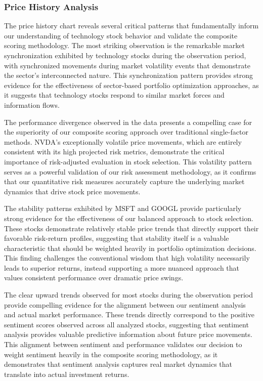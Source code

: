 \documentclass[12pt,a4paper]{article}
\begin{document}
\subsubsection{Price History Analysis}
The price history chart reveals several critical patterns that fundamentally inform our understanding of technology stock behavior and validate the composite scoring methodology. The most striking observation is the remarkable market synchronization exhibited by technology stocks during the observation period, with synchronized movements during market volatility events that demonstrate the sector's interconnected nature. This synchronization pattern provides strong evidence for the effectiveness of sector-based portfolio optimization approaches, as it suggests that technology stocks respond to similar market forces and information flows.

The performance divergence observed in the data presents a compelling case for the superiority of our composite scoring approach over traditional single-factor methods. NVDA's exceptionally volatile price movements, which are entirely consistent with its high projected risk metrics, demonstrate the critical importance of risk-adjusted evaluation in stock selection. This volatility pattern serves as a powerful validation of our risk assessment methodology, as it confirms that our quantitative risk measures accurately capture the underlying market dynamics that drive stock price movements.

The stability patterns exhibited by MSFT and GOOGL provide particularly strong evidence for the effectiveness of our balanced approach to stock selection. These stocks demonstrate relatively stable price trends that directly support their favorable risk-return profiles, suggesting that stability itself is a valuable characteristic that should be weighted heavily in portfolio optimization decisions. This finding challenges the conventional wisdom that high volatility necessarily leads to superior returns, instead supporting a more nuanced approach that values consistent performance over dramatic price swings.

The clear upward trends observed for most stocks during the observation period provide compelling evidence for the alignment between our sentiment analysis and actual market performance. These trends directly correspond to the positive sentiment scores observed across all analyzed stocks, suggesting that sentiment analysis provides valuable predictive information about future price movements. This alignment between sentiment and performance validates our decision to weight sentiment heavily in the composite scoring methodology, as it demonstrates that sentiment analysis captures real market dynamics that translate into actual investment returns.
\end{document}
